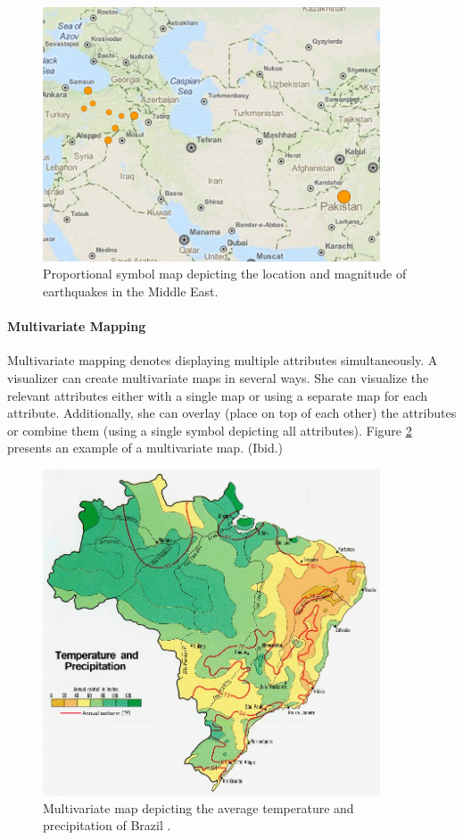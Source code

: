 \begin{figure}[htbp]
  \begin{center}
    \includegraphics[width=10cm]{images/proportionalsymbol-example.png}
    \caption{Proportional symbol map depicting the location and magnitude of earthquakes in the Middle East. \citep{globalincidentmap_live_2014}}
    \label{fig:proportionalsymbol}
  \end{center}
\end{figure}

\paragraph{Multivariate Mapping}

Multivariate mapping denotes displaying multiple attributes simultaneously. A visualizer can create multivariate maps in several ways. She can visualize the relevant attributes either with a single map or using a separate map for each attribute. Additionally, she can overlay (place on top of each other) the attributes or combine them (using a single symbol depicting all attributes). Figure \ref{fig:multivariate} presents an example of a multivariate map. (Ibid.)

\begin{figure}[htbp]
  \begin{center}
    \includegraphics[width=10cm]{images/multivariate-example.jpg}
    \caption{Multivariate map depicting the average temperature and precipitation of Brazil \citep{central_intelligence_agency_temperature_1977}.}
    \label{fig:multivariate}
  \end{center}
\end{figure}

